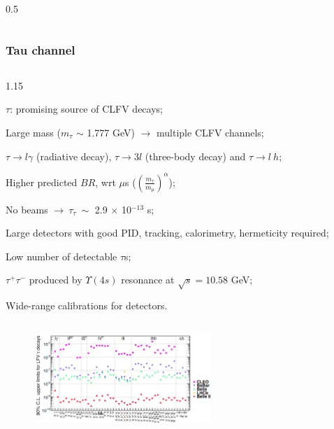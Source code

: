 \documentclass{beamer}
\begin{document}
\begin{frame}
\begin{columns}
\begin{column}{0.5\framewidth}
\begin{figure}[!h]
                \label{fig:comet}
                \end{figure}
    \end{column}
\end{columns}
    \end{frame}


   









\begin{frame}
    \frametitle{Tau channel}
    \vspace{-3mm}
    \begin{columns}
     \begin{column}{1.15\framewidth}
     \setlength{\leftmargini}{1.1em}
    
        \begin{itemize}
       {\small     \item  $\tau$: promising source of CLFV decays;
       \item Large mass ($m_\tau$ $\sim$ 1.777 GeV) $\rightarrow$ multiple CLFV channels;
       \item $\tau \rightarrow l \gamma$ (radiative decay), $\tau \rightarrow 3l$ (three-body decay) 
       and $\tau\rightarrow l \ h$;
            \item Higher predicted $BR$, wrt $\mu$s ($(\frac{m_\tau}{m_\mu})^\alpha$);
            \item No beams $\rightarrow \ \tau_\tau \ \sim$ 2.9 $\times$ 10$^{-13}$ s;
\item    Large detectors with good PID, tracking, calorimetry, hermeticity required; 
\item Low number of detectable $\tau$s;
\item $\tau^+ \tau^-$ produced by $\Upsilon(4s)$ resonance at $\sqrt{s}=10.58$ GeV;
        \item Wide-range calibrations for detectors.  
       }
    \end{itemize}
\end{column}
\end{columns}
   
    \begin{figure}[!h]
      \centering
      \includegraphics[width =0.6\textwidth]{figures/png/Screenshot_20240319_134052.png}
      \label{fig:tauchannel}
      \end{figure}
  
\end{frame}
\end{document}
